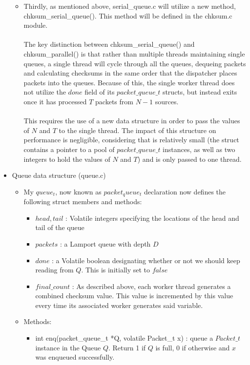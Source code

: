 \documentclass[]{article}
\begin{document}
\begin{itemize}
\begin{itemize}
		\item Thirdly, as mentioned above, serial\_queue.c will utilize a new method, chksum\_serial\_queue(). This method will be defined in the chksum.c module.
		\\\\
		The key distinction between chksum\_serial\_queue() and chksum\_parallel() is that rather than multiple threads maintaining single queues, a single thread will cycle through all the queues, dequeing packets and calculating checksums in the same order that the dispatcher places packets into the queues. Because of this, the single worker thread does not utilize the $done$ field of its $packet\_queue\_t$ structs, but instead exits once it has processed $T$ packets from $N - 1$ sources.
		\\\\
		This requires the use of a new data structure in order to pass the values of $N$ and $T$ to the single thread. The impact of this structure on performance is negligible, considering that is relatively small (the struct contains a pointer to a pool of $packet\_queue\_t$ instances, as well as two integers to hold the values of $N$ and $T$) and is only passed to one thread.
	\end{itemize}
	\item Queue data structure (queue.c)
	\begin{itemize}
		\item My $queue_t$, now known as $packet_queue_t$ declaration now defines the following struct members and methods:
		\begin{itemize}
			\item $head, tail$ : Volatile integers specifying the locations of the head and tail of the queue
			\item $packets$ : a Lamport queue with depth $D$
			\item $done$ : a Volatile boolean designating whether or not we should keep
			reading from $Q$. This is initially set to $false$
			\item $final\_count$ : As described above, each worker thread generates a combined checksum value. This value is incremented by this value every time its associated worker generates said variable.
		\end{itemize}
		\item Methods:
		\begin{itemize}
			\item int enq(packet\_queue\_t *Q, volatile Packet\_t x) : queue a $Packet\_t$ instance in the Queue $Q$. Return 1 if $Q$ is full, 0 if otherwise and $x$ was enqueued successfully.

\end{itemize}
\end{itemize}
\end{itemize}
\end{document}
